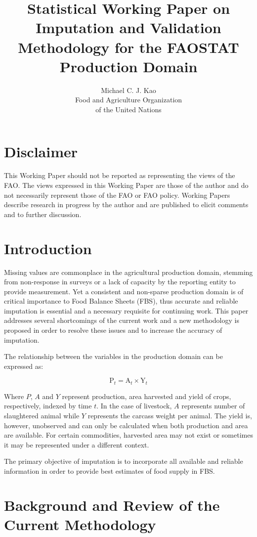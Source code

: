 \documentclass[nojss]{jss}\usepackage[]{graphicx}\usepackage[]{color}
\title{\bf Statistical Working Paper on Imputation and Validation
  Methodology for the FAOSTAT Production Domain}
\author{Michael C. J. Kao\\ Food and Agriculture Organization \\ of
  the United Nations}
\begin{document}
\section*{Disclaimer}
This Working Paper should not be reported as representing the views of
the FAO. The views expressed in this Working Paper are those of the
author and do not necessarily represent those of the FAO or FAO
policy. Working Papers describe research in progress by the author and
are published to elicit comments and to further discussion.

\section{Introduction}
Missing values are commonplace in the agricultural production domain,
stemming from non-response in surveys or a lack of capacity by the
reporting entity to provide measurement. Yet a consistent and
non-sparse production domain is of critical importance to Food Balance
Sheets (FBS), thus accurate and reliable imputation is essential and a
necessary requisite for continuing work. This paper addresses several
shortcomings of the current work and a new methodology is proposed in
order to resolve these issues and to increase the accuracy of
imputation.

The relationship between the variables in the production domain can be
expressed as:

\begin{equation}
  \label{eq:identity}
  \text{P}_t = \text{A}_t \times \text{Y}_t
\end{equation}


Where $P$, $A$ and $Y$ represent production, area harvested and yield
of crops, respectively, indexed by time $t$. In the case of livestock,
$A$ represents number of slaughtered animal while $Y$ represents the
carcass weight per animal. The yield is, however, unobserved and can
only be calculated when both production and area are available. For
certain commodities, harvested area may not exist or sometimes it may
be represented under a different context.


The primary objective of imputation is to incorporate all
available and reliable information in order to provide best estimates of
food supply in FBS.

\section{Background and Review of the Current Methodology}
\end{document}
